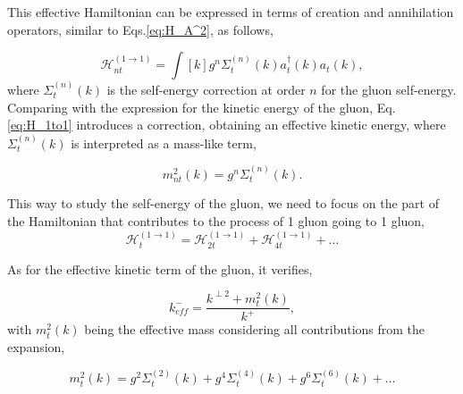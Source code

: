 \documentclass[11pt,a4paper,twoside,pdf]{article}
\numberwithin{equation}{section}
\begin{document}
This effective Hamiltonian can be expressed in terms of creation and annihilation operators,
similar to Eqs.\eqref{eq:H_A^2}, as follows,

\begin{equation}
    \mathcal{H}_{n t}^{(1 \rightarrow 1)} = \int [k] g^n \Sigma_t^{(n)} (k) 
    a^{\dagger}_t (k) a_t (k),
    \label{eq:H_1to1}
\end{equation}
where $\Sigma_t^{(n)} (k)$ is the self-energy correction at order $n$ for the gluon
self-energy. Comparing with the expression for the kinetic energy of the gluon, Eq.
\eqref{eq:H_1to1} introduces a correction, obtaining an effective kinetic energy, where
$\Sigma_t^{(n)} (k)$ is interpreted as a mass-like term,

\begin{equation}
    m_{n t}^2 (k) = g^n \Sigma_t^{(n)} (k).
\end{equation}

This way to study the self-energy of the gluon, we need to focus on the part of the
Hamiltonian that contributes to the process of 1 gluon going to 1 gluon,
\begin{equation}
    \mathcal{H}_{t}^{(1 \rightarrow 1)} = \mathcal{H}_{2 t}^{(1 \rightarrow 1)} + 
    \mathcal{H}_{4 t}^{(1 \rightarrow 1)} + \ldots
\end{equation}

As for the effective kinetic term of the gluon, it verifies,

\begin{equation}
    k_{eff}^- = \frac{k^{\perp 2} + m_{t}^2 (k)}{k^+}, 
\end{equation}
with $m_{t}^2 (k)$ being the effective mass considering all contributions from the 
expansion,

\begin{equation}
    m_{t}^2 (k) = g^2 \Sigma_t^{(2)} (k) + g^4 \Sigma_t^{(4)} (k) + g^6 \Sigma_t^{(6)} (k) + \ldots
\end{equation} 

\end{document}
